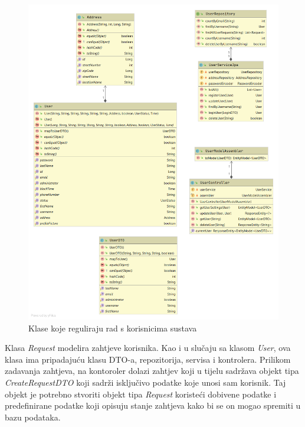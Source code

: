 				
			
				\begin{figure}[H]
				\includegraphics[scale=0.38]{slike/cs2.png} %
				\centering
				\caption{Klase koje reguliraju rad s korisnicima sustava}
				
				\end{figure}
			
				\newpage
				
				Klasa \textit{Request} modelira zahtjeve korisnika. Kao i u slučaju sa klasom \textit{User}, ova klasa ima pripadajuću klasu DTO-a, repozitorija, servisa i kontrolera. 
				Prilikom zadavanja zahtjeva, na kontoroler dolazi zahtjev koji u tijelu sadržava objekt tipa \textit{CreateRequestDTO} koji sadrži isključivo podatke koje unosi sam korisnik. Taj objekt je potrebno stvoriti objekt tipa \textit{Request} koristeći dobivene podatke i predefinirane podatke koji opisuju stanje zahtjeva kako bi se on mogao spremiti u bazu podataka.
				
				
			
